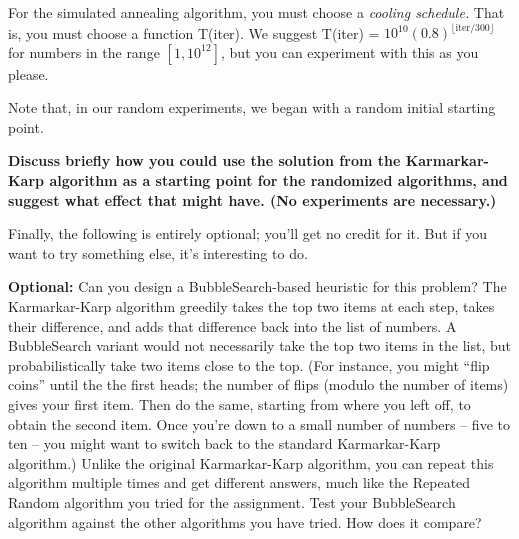 \documentclass[11pt]{article}
\begin{document}
For the simulated annealing algorithm, you must choose a {\em cooling
schedule.}  That is, you must choose a function T(iter).  We suggest
T(iter) = $10^{10}(0.8)^{\lfloor \mbox{iter} / 300 \rfloor}$ for
numbers in the range $[1,10^{12}]$, but you can experiment with this
as you please.  

Note that, in our random experiments, we began with a random initial
starting point.

{\bf Discuss briefly how you could use the solution from the
Karmarkar-Karp algorithm as a starting point for the randomized
algorithms, and suggest what effect that might have. 
(No experiments are necessary.)}

Finally, the following is entirely optional;  you'll get no credit for it.
But if you want to try something else, it's interesting to do.

{\bf Optional:} Can you design a BubbleSearch-based heuristic for this
problem?
The Karmarkar-Karp algorithm greedily takes the top two items at each
step, takes their difference, and adds that difference back into the
list of numbers.  A BubbleSearch variant would not necessarily take
the top two items in the list, but probabilistically take two items
close to the top.  (For instance, you might ``flip coins'' until the
the first heads;  the number of flips (modulo the number of items) 
gives your first item.  Then do the same, starting from where you
left off, to obtain the second item.  Once you're down to a small
number of numbers -- five to ten -- you might want to switch back
to the standard Karmarkar-Karp algorithm.)  Unlike the original 
Karmarkar-Karp algorithm, you can repeat this algorithm multiple
times and get different answers, much like the Repeated Random algorithm
you tried for the assignment.  Test your BubbleSearch algorithm
against the other algorithms you have tried.  How does it compare?
\end{document}

